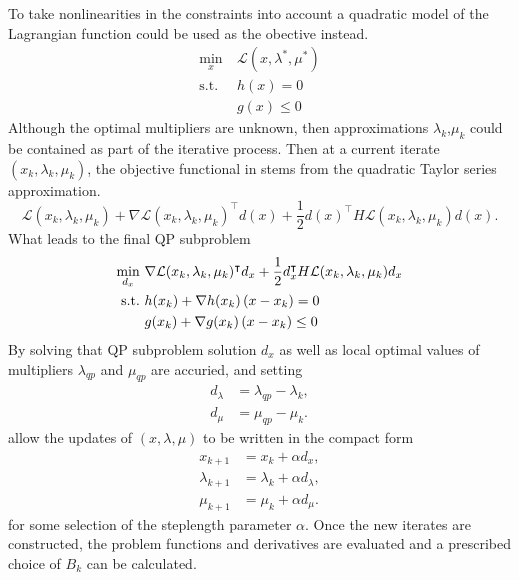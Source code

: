 To take nonlinearities in the constraints into account a quadratic model of the Lagrangian function could be used as the obective instead.
\begin{subequations}
	\begin{align}
	\min_{x}\  & \mathcal{L}(x,\lambda^*,\mu^*)\\
	\text{s.t.}\  &h(x)= 0\\
	&g(x)\leq 0
	\end{align}
\end{subequations}
Although the optimal multipliers are unknown, then approximations $\lambda_k$,$\mu_k$ could be contained as part of the iterative process. Then at a current iterate $(x_k,\lambda_k,\mu_k)$, the objective functional in stems from the quadratic Taylor series approximation.
\begin{equation}
	\mathcal{L}(x_k,\lambda_k,\mu_k)+\nabla\mathcal{L}(x_k,\lambda_k,\mu_k)^\intercal d(x)+\frac{1}{2}d(x)^\intercal H\mathcal{L}(x_k,\lambda_k,\mu_k) d(x).
\end{equation}
What leads to the final QP subproblem
\begin{subequations}
	\begin{align}
	\min_{d_x}\  &\nabla \mathcal{L}(x_k,\lambda_k,\mu_k)^\intercal d_x+\frac{1}{2}d_x^\intercal H\mathcal{L}(x_k,\lambda_k,\mu_k)d_x\\
	\text{s.t.}\  &h(x_k)+\nabla h(x_k)\left( x-x_k \right) = 0\\
	&g(x_k)+\nabla g(x_k)\left( x-x_k \right)\leq 0
	\end{align}
\end{subequations}
By solving that QP subproblem solution $d_x$ as well as local optimal values of multipliers $\lambda_{qp}$ and $\mu_{qp}$ are accuried, and setting 
\begin{subequations}
	\begin{align}
		d_\lambda &= \lambda_{qp}-\lambda_k,\\
		d_\mu &= \mu_{qp}-\mu_k.
	\end{align}
\end{subequations}
allow the updates of $(x,\lambda,\mu)$ to be written in the compact form
\begin{subequations}
	\begin{align}
	x_{k+1} &= x_k + \alpha d_x,\\
	\lambda_{k+1} &= \lambda_k + \alpha d_\lambda,\\
	\mu_{k+1} &= \mu_k + \alpha d_\mu.
	\end{align}
\end{subequations}
for some selection of the steplength parameter $\alpha$. Once the new iterates are constructed, the problem functions and derivatives are evaluated and a
prescribed choice of $B_k$ can be calculated.


